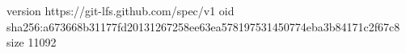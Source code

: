 version https://git-lfs.github.com/spec/v1
oid sha256:a673668b31177fd20131267258ee63ea578197531450774eba3b84171c2f67c8
size 11092
